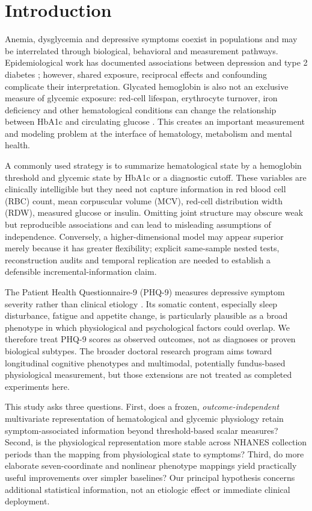\documentclass[11pt,a4paper]{article}
\begin{document}
\section{Introduction}
Anemia, dysglycemia and depressive symptoms coexist in populations and may be interrelated through biological, behavioral and measurement pathways. Epidemiological work has documented associations between depression and type 2 diabetes \cite{mezuk2008}; however, shared exposure, reciprocal effects and confounding complicate their interpretation. Glycated hemoglobin is also not an exclusive measure of glycemic exposure: red-cell lifespan, erythrocyte turnover, iron deficiency and other hematological conditions can change the relationship between HbA1c and circulating glucose \cite{ada2024}. This creates an important measurement and modeling problem at the interface of hematology, metabolism and mental health.

A commonly used strategy is to summarize hematological state by a hemoglobin threshold and glycemic state by HbA1c or a diagnostic cutoff. These variables are clinically intelligible but they need not capture information in red blood cell (RBC) count, mean corpuscular volume (MCV), red-cell distribution width (RDW), measured glucose or insulin. Omitting joint structure may obscure weak but reproducible associations and can lead to misleading assumptions of independence. Conversely, a higher-dimensional model may appear superior merely because it has greater flexibility; explicit same-sample nested tests, reconstruction audits and temporal replication are needed to establish a defensible incremental-information claim.

The Patient Health Questionnaire-9 (PHQ-9) measures depressive symptom severity rather than clinical etiology \cite{kroenke2001}. Its somatic content, especially sleep disturbance, fatigue and appetite change, is particularly plausible as a broad phenotype in which physiological and psychological factors could overlap. We therefore treat PHQ-9 scores as observed outcomes, not as diagnoses or proven biological subtypes. The broader doctoral research program aims toward longitudinal cognitive phenotypes and multimodal, potentially fundus-based physiological measurement, but those extensions are not treated as completed experiments here.

This study asks three questions. First, does a frozen, \emph{outcome-independent} multivariate representation of hematological and glycemic physiology retain symptom-associated information beyond threshold-based scalar measures? Second, is the physiological representation more stable across NHANES collection periods than the mapping from physiological state to symptoms? Third, do more elaborate seven-coordinate and nonlinear phenotype mappings yield practically useful improvements over simpler baselines? Our principal hypothesis concerns additional statistical information, not an etiologic effect or immediate clinical deployment.
\end{document}
